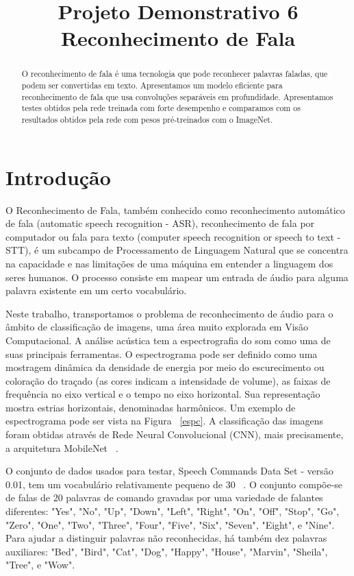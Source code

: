 \documentclass{bmvc2k}
\title{Projeto Demonstrativo 6\\ Reconhecimento de Fala}
\begin{document}
\maketitle

\begin{abstract}

O reconhecimento de fala é uma tecnologia que pode reconhecer palavras faladas, que podem ser convertidas em texto. Apresentamos um modelo eficiente para reconhecimento de fala que usa convoluções separáveis em profundidade. Apresentamos testes obtidos pela rede treinada com forte desempenho e comparamos com os resultados obtidos pela rede com pesos pré-treinados com o ImageNet.

\end{abstract}

\section{Introdução}
\label{sec:intro}

O Reconhecimento de Fala, também conhecido como reconhecimento automático de fala (automatic speech recognition - ASR), reconhecimento de fala por computador ou fala para texto (computer speech recognition or speech to text - STT), é um subcampo de Processamento de Linguagem Natural que se concentra na capacidade e nas limitações de uma máquina em entender a linguagem dos seres humanos. O processo consiste em mapear um entrada de áudio para alguma palavra existente em um certo vocabulário. 

Neste trabalho, transportamos o problema de reconhecimento de áudio para o âmbito de classificação de imagens, uma área muito explorada em Visão Computacional. A análise acústica tem a espectrografia do som como uma de suas principais ferramentas. O espectrograma pode ser definido como uma mostragem dinâmica da densidade de energia por meio do escurecimento ou coloração do traçado (as cores indicam a intensidade de volume), as faixas de frequência no eixo vertical e o tempo no eixo horizontal. Sua representação mostra estrias horizontais, denominadas harmônicos. Um exemplo de espectrograma pode ser vista na Figura ~\ref{espc}. A classificação das imagens foram obtidas através de Rede Neural Convolucional (CNN), mais precisamente, a arquitetura MobileNet ~\cite{mobilenets}.

O conjunto de dados usados para testar, Speech Commands Data Set - versão 0.01, tem um vocabulário relativamente pequeno de 30 ~\cite{speechcommandsv2}. O conjunto compõe-se de falas de 20 palavras de comando gravadas por uma variedade de falantes diferentes:  "Yes", "No", "Up", "Down", "Left", "Right", "On", "Off", "Stop", "Go", "Zero", "One", "Two", "Three", "Four", "Five", "Six", "Seven", "Eight", e "Nine". Para ajudar a distinguir palavras não reconhecidas, há também dez palavras auxiliares:  "Bed", "Bird", "Cat", "Dog", "Happy", "House", "Marvin", "Sheila", "Tree", e "Wow".
\end{document}
